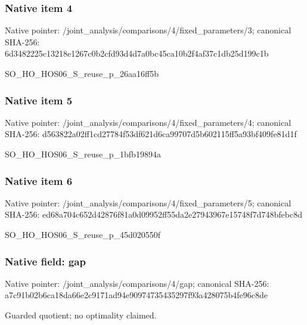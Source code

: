 \documentclass[10pt,a4paper]{article}
\begin{document}
\subsubsection{Native item 4}
Native pointer: /joint\_\allowbreak{}analysis/comparisons/4/fixed\_\allowbreak{}parameters/3; canonical SHA-256: 6d3482225c13218e1267c0b2cfd93d4d7a0bc45ca10b2f4af37c1db25d199c1b

\begingroup\raggedright\sloppy SO\_\allowbreak{}HO\_\allowbreak{}HOS06\_\allowbreak{}S\_\allowbreak{}reuse\_\allowbreak{}p\_\allowbreak{}26aa16ff5b\par\endgroup

\subsubsection{Native item 5}
Native pointer: /joint\_\allowbreak{}analysis/comparisons/4/fixed\_\allowbreak{}parameters/4; canonical SHA-256: d563822a02ff1cd27784f53df621d6ca99707d5b602115ff5a93bf409fe81d1f

\begingroup\raggedright\sloppy SO\_\allowbreak{}HO\_\allowbreak{}HOS06\_\allowbreak{}S\_\allowbreak{}reuse\_\allowbreak{}p\_\allowbreak{}1bfb19894a\par\endgroup

\subsubsection{Native item 6}
Native pointer: /joint\_\allowbreak{}analysis/comparisons/4/fixed\_\allowbreak{}parameters/5; canonical SHA-256: ed68a704c652d42876f81a0d09952ff55da2e27943967e15748f7d748bfebc8d

\begingroup\raggedright\sloppy SO\_\allowbreak{}HO\_\allowbreak{}HOS06\_\allowbreak{}S\_\allowbreak{}reuse\_\allowbreak{}p\_\allowbreak{}45d020550f\par\endgroup

\subsubsection{Native field: gap}
Native pointer: /joint\_\allowbreak{}analysis/comparisons/4/gap; canonical SHA-256: a7c91b02b6ca18da66e2c9171ad94e90974735435297f93a428075b4fe96c8de

\begingroup\raggedright\sloppy Guarded quotient;\allowbreak{} no optimality claimed.\par\endgroup
\end{document}
